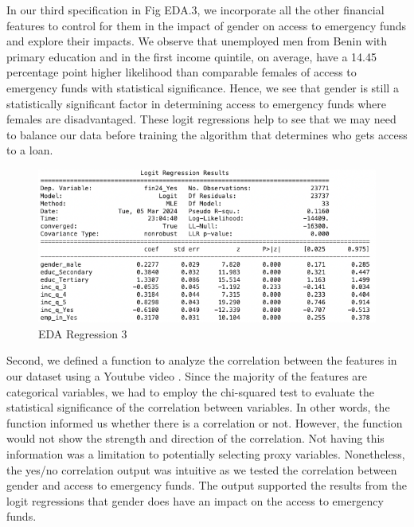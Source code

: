 \documentclass[12pt]{article}
\begin{document}
In our third specification in Fig EDA.3, we incorporate all the other
financial features to control for them in the impact of gender on access
to emergency funds and explore their impacts. We observe that unemployed
men from Benin with primary education and in the first income quintile,
on average, have a 14.45 percentage point higher likelihood than
comparable females of access to emergency funds with statistical
significance. Hence, we see that gender is still a statistically
significant factor in determining access to emergency funds where
females are disadvantaged. These logit regressions help to see that we
may need to balance our data before training the algorithm that
determines who gets access to a loan.

\begin{figure}

{\centering \includegraphics[width=1\linewidth]{graphs/eda3} 

}

\caption{EDA Regression 3}\label{fig:unnamed-chunk-16}
\end{figure}

Second, we defined a function to analyze the correlation between the
features in our dataset using a Youtube video \citep{ML_explained}.
Since the majority of the features are categorical variables, we had to
employ the chi-squared test to evaluate the statistical significance of
the correlation between variables. In other words, the function informed
us whether there is a correlation or not. However, the function would
not show the strength and direction of the correlation. Not having this
information was a limitation to potentially selecting proxy variables.
Nonetheless, the yes/no correlation output was intuitive as we tested
the correlation between gender and access to emergency funds. The output
supported the results from the logit regressions that gender does have
an impact on the access to emergency funds.
\end{document}
